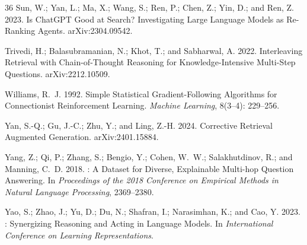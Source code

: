 \begin{thebibliography}{36}
Sun, W.; Yan, L.; Ma, X.; Wang, S.; Ren, P.; Chen, Z.; Yin, D.; and Ren, Z. 2023.
\newblock Is {ChatGPT} Good at Search? Investigating Large Language Models as Re-Ranking Agents.
\newblock arXiv:2304.09542.

Trivedi, H.; Balasubramanian, N.; Khot, T.; and Sabharwal, A. 2022.
\newblock Interleaving Retrieval with Chain-of-Thought Reasoning for Knowledge-Intensive Multi-Step Questions.
\newblock arXiv:2212.10509.

Williams, R.~J. 1992.
\newblock Simple Statistical Gradient-Following Algorithms for Connectionist Reinforcement Learning.
\newblock \emph{Machine Learning}, 8(3--4): 229--256.

Yan, S.-Q.; Gu, J.-C.; Zhu, Y.; and Ling, Z.-H. 2024.
\newblock Corrective Retrieval Augmented Generation.
\newblock arXiv:2401.15884.

Yang, Z.; Qi, P.; Zhang, S.; Bengio, Y.; Cohen, W.~W.; Salakhutdinov, R.; and Manning, C.~D. 2018.
: A Dataset for Diverse, Explainable Multi-hop Question Answering.
\newblock In \emph{Proceedings of the 2018 Conference on Empirical Methods in Natural Language Processing}, 2369--2380.

Yao, S.; Zhao, J.; Yu, D.; Du, N.; Shafran, I.; Narasimhan, K.; and Cao, Y. 2023.
: Synergizing Reasoning and Acting in Language Models.
\newblock In \emph{International Conference on Learning Representations}.

\end{thebibliography}
